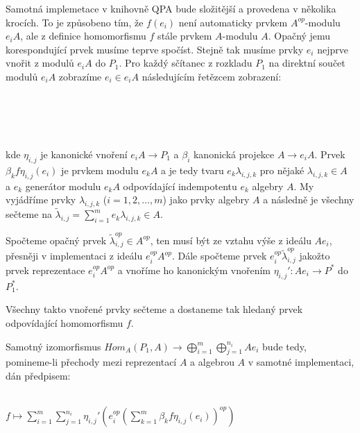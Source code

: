        Samotná implemetace v knihovně QPA bude složitější a provedena v 
       několika krocích. To je způsobeno tím, že $f(e_i)$ není automaticky prvkem $A^{op}$-modulu $e_iA$, 
       ale z definice homomorfismu $f$ stále prvkem $A$-modulu $A$. Opačný jemu korespondující prvek 
       musíme teprve spočíst. Stejně tak musíme prvky $e_i$ nejprve vnořit z modulů $e_iA$ do $P_1$. 
       Pro každý sčítanec z rozkladu $P_1$ na direktní součet 
       modulů $e_iA$ zobrazíme $e_i\in e_iA$ následujícím řetězcem zobrazení: 
       \\\\
       \centerline{} \\\\\\     
      kde $\eta_{i,j}$ je kanonické vnoření $e_iA\rightarrow P_1$ a $\beta_i$ 
      kanonická projekce $A\rightarrow e_iA$. Prvek $\beta_k f \eta_{i,j}(e_i)$ je prvkem modulu 
      $e_kA$ a je tedy tvaru $e_k \lambda_{i,j,k}$ pro nějaké $\lambda_{i,j,k}\in A$ a 
      $e_k$ generátor modulu $e_kA$ odpovídající indempotentu $e_k$ algebry $A$. My 
      vyjádříme prvky $\lambda_{i,j,k}$ ($i=1,2,\ldots,m$) jako prvky algebry $A$ a následně je všechny sečteme 
      na 
      $\tilde\lambda_{i,j}=\sum_{i=1}^m e_k\lambda_{i,j,k} \in A$. 
      
      Spočteme 
      opačný prvek $\tilde\lambda_{i,j}^{op}\in A^{op}$, ten musí být ze vztahu výše z 
      ideálu $Ae_i$, přesněji v \cite{QPA} implementaci z ideálu $e_i^{op} A^{op}$.
      Dále spočteme prvek $e_i^{op}\tilde\lambda_{i,j}^{op}$ jakožto prvek reprezentace 
      $e_i^{op}A^{op}$ a vnoříme ho kanonickým vnořením $\eta_{i,j}':Ae_i\to P^*$ do $P_1^*$.
      
      Všechny takto vnořené prvky sečteme a dostaneme tak hledaný prvek odpovídající 
      homomorfismu $f$.
        
      Samotný izomorfismus  $Hom_A (P_1,A) \rightarrow \bigoplus_{i=1}^m\bigoplus_{j=1}^{n_i}Ae_i$
      bude tedy, pomineme-li přechody mezi reprezentací $A$ a algebrou $A$ v samotné implementaci, 
      dán předpisem: \\\\
         \centerline{
           $f\mapsto\sum_{i=1}^m\sum_{j=1}^{n_i} \eta_{i,j}'(e_i^{op} (\sum_{k=1}^m\beta_kf\eta_{i,j}(e_i))^{op})$
         } \\\\


